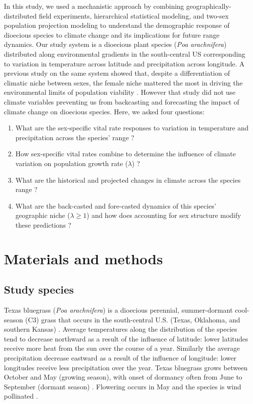 \documentclass[12pt]{article}
\begin{document}
In this study, we used a mechanistic approach by combining geographically-distributed field experiments, hierarchical statistical modeling, and two-sex population projection modeling to understand the demographic response of dioecious species to climate change and its implications for future range dynamics.
Our study system is a dioecious plant species (\textit{Poa arachnifera}) distributed along environmental gradients in the south-central US corresponding to variation in temperature across latitude and precipitation across longitude. 
A previous study on the same system showed that, despite a differentiation of climatic niche between sexes, the female niche mattered the most in driving the environmental limits of population viability \citep{miller2022two}.
However that study did not use climate variables preventing us from backcasting and forecasting the impact of climate change on dioecious species.
Here, we asked four questions: 
\begin{enumerate}
	\item What are the sex-specific vital rate responses to variation in temperature and precipitation across the species' range ?
	\item How sex-specific vital rates combine to determine the influence of climate variation on population growth rate ($\lambda$) ?
	\item What are the historical and projected changes in climate across the species range ?
	\item What are the back-casted and fore-casted dynamics of this species' geographic niche ($\lambda \geq 1$) and how does accounting for sex structure modify these predictions ?
\end{enumerate}

\section*{Materials and methods}
\subsection*{Study species}
Texas bluegrass (\textit{Poa arachnifera}) is a dioecious perennial, summer-dormant cool-season (C3) grass that occurs in the south-central U.S. (Texas, Oklahoma, and southern Kansas) \citep{hitchcock1971manual}. 
Average temperatures along the distribution of the species tend to decrease northward as a result of the influence of latitude: lower latitudes receive more heat from the sun over the course of a year.
Similarly the average precipitation decrease eastward as a result of the influence of longitude: lower longitudes receive less precipitation over the year.
Texas bluegrass grows between October and May (growing season), with onset of dormancy often from June to September (dormant season) \citep{kindiger2004interspecific}.
Flowering occurs in May and the species is wind pollinated \citep{hitchcock1971manual}.
\end{document}

